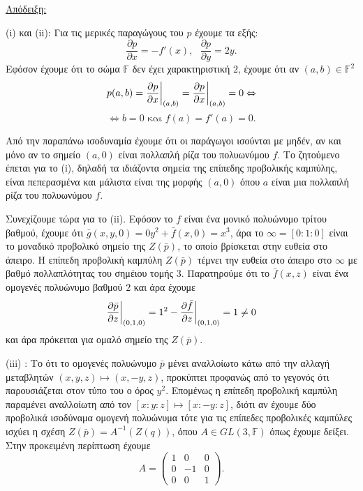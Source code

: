 \documentclass[12pt, a4paper]{book}
\begin{document}
\underline{Απόδειξη: } 

\textlatin{(i)} και \textlatin{(ii)}: Για τις μερικές παραγώγους του $p$ έχουμε τα εξής:
\begin{displaymath}
\frac{\partial p}{\partial x} = -f'(x), \text{  } \frac{\partial p}{\partial y}=2y.
\end{displaymath}
Εφόσον έχουμε ότι το σώμα $\mathbb{F}$ δεν έχει χαρακτηριστική $2$, έχουμε ότι αν $(a,b) \in \mathbb{F}^2$
\begin{displaymath}
p(a,b)= \frac{\partial p}{\partial x} \bigg{|}_{(a,b)}= \frac{\partial p}{\partial x} \bigg{|}_{(a,b)}=0 \Leftrightarrow
\end{displaymath}
\begin{displaymath}
\Leftrightarrow b=0 \text{  και  } f(a)=f'(a)=0.
\end{displaymath}

Από την παραπάνω ισοδυναμία έχουμε ότι οι παράγωγοι ισούνται με μηδέν, αν και μόνο αν το σημείο $(a,0)$ είναι πολλαπλή ρίζα του πολυωνύμου $f$. Το ζητούμενο έπεται για το \textlatin{(i)}, δηλαδή τα ιδιάζοντα σημεία της επίπεδης προβολικής καμπύλης, είναι πεπερασμένα και μάλιστα είναι της μορφής $(a,0)$ όπου $a$ είναι μια πολλαπλή ρίζα του πολυωνύμου $f$. 

Συνεχίζουμε τώρα για το \textlatin{(ii)}. Εφόσον το $f$ είναι ένα μονικό πολυώνυμο τρίτου βαθμού, έχουμε ότι $\bar{g}(x,y,0)=0y^2+\bar{f}(x,0)=x^3$, άρα το $\infty = [0:1:0]$ είναι το μοναδικό προβολικό σημείο της $Z(\bar{p})$, το οποίο βρίσκεται στην ευθεία στο άπειρο. Η επίπεδη προβολική καμπύλη $Z(\bar{p})$ τέμνει την ευθεία στο άπειρο στο $\infty$ με βαθμό πολλαπλότητας του σημέιου τομής $3$. Παρατηρούμε ότι το $\bar{f}(x,z)$ είναι ένα ομογενές πολυώνυμο βαθμού $2$ και άρα έχουμε 
\begin{displaymath}
\frac{\partial\bar{p}}{\partial z}\bigg{|}_{(0,1,0)}=1^2-\frac{\partial \bar{f}}{\partial z}\bigg{|}_{(0,1,0)}=1 \neq 0
\end{displaymath}
και άρα πρόκειται για ομαλό σημείο της $Z(\bar{p})$.

\textlatin{(iii)} : Το ότι το ομογενές πολυώνυμο $\bar{p}$ μένει αναλλοίωτο κάτω από την αλλαγή μεταβλητών $(x,y,z) \mapsto (x,-y,z)$, προκύπτει προφανώς από το γεγονός ότι παρουσιάζεται στον τύπο του ο όρος $y^2$. Επομένως η επίπεδη προβολική καμπύλη παραμένει αναλλοίωτη από τον $[x:y:z] \mapsto [x:-y:z]$, διότι αν έχουμε δύο προβολικά ισοδύναμα ομογενή πολυώνυμα τότε για τις επίπεδες προβολικές καμπύλες ισχύει η σχέση $Z(\bar{p})= Α^{-1}(Ζ(q))$, όπου $A \in GL(3,\mathbb{F})$ όπως έχουμε δείξει. Στην προκειμένη περίπτωση έχουμε
\begin{displaymath}
A= \begin{pmatrix} 1& 0 & 0 \\ 0 & -1 & 0 \\ 0 & 0 & 1 \end{pmatrix}.
\end{displaymath}
\end{document}

